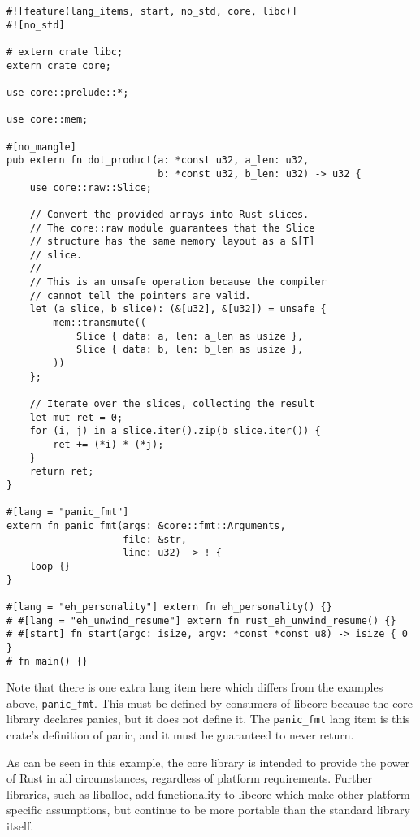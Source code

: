 \documentclass[a4paper,]{book}
\begin{document}
\begin{verbatim}
#![feature(lang_items, start, no_std, core, libc)]
#![no_std]

# extern crate libc;
extern crate core;

use core::prelude::*;

use core::mem;

#[no_mangle]
pub extern fn dot_product(a: *const u32, a_len: u32,
                          b: *const u32, b_len: u32) -> u32 {
    use core::raw::Slice;

    // Convert the provided arrays into Rust slices.
    // The core::raw module guarantees that the Slice
    // structure has the same memory layout as a &[T]
    // slice.
    //
    // This is an unsafe operation because the compiler
    // cannot tell the pointers are valid.
    let (a_slice, b_slice): (&[u32], &[u32]) = unsafe {
        mem::transmute((
            Slice { data: a, len: a_len as usize },
            Slice { data: b, len: b_len as usize },
        ))
    };

    // Iterate over the slices, collecting the result
    let mut ret = 0;
    for (i, j) in a_slice.iter().zip(b_slice.iter()) {
        ret += (*i) * (*j);
    }
    return ret;
}

#[lang = "panic_fmt"]
extern fn panic_fmt(args: &core::fmt::Arguments,
                    file: &str,
                    line: u32) -> ! {
    loop {}
}

#[lang = "eh_personality"] extern fn eh_personality() {}
# #[lang = "eh_unwind_resume"] extern fn rust_eh_unwind_resume() {}
# #[start] fn start(argc: isize, argv: *const *const u8) -> isize { 0 }
# fn main() {}
\end{verbatim}

Note that there is one extra lang item here which differs from the
examples above, \texttt{panic\_fmt}. This must be defined by consumers
of libcore because the core library declares panics, but it does not
define it. The \texttt{panic\_fmt} lang item is this crate's definition
of panic, and it must be guaranteed to never return.

As can be seen in this example, the core library is intended to provide
the power of Rust in all circumstances, regardless of platform
requirements. Further libraries, such as liballoc, add functionality to
libcore which make other platform-specific assumptions, but continue to
be more portable than the standard library itself.

\end{document}

